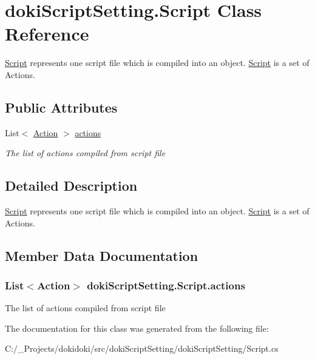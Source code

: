 \hypertarget{classdoki_script_setting_1_1_script}{}\section{doki\+Script\+Setting.\+Script Class Reference}
\label{classdoki_script_setting_1_1_script}


\hyperlink{classdoki_script_setting_1_1_script}{Script} represents one script file which is compiled into an object. \hyperlink{classdoki_script_setting_1_1_script}{Script} is a set of Actions.  


\subsection*{Public Attributes}
\begin{DoxyCompactItemize}
\item 
List$<$ \hyperlink{classdoki_script_setting_1_1_action}{Action} $>$ \hyperlink{classdoki_script_setting_1_1_script_a7c04074aaeee592285f12d92718bea52}{actions}
\begin{DoxyCompactList}\small\item\em The list of actions compiled from script file \end{DoxyCompactList}\end{DoxyCompactItemize}


\subsection{Detailed Description}
\hyperlink{classdoki_script_setting_1_1_script}{Script} represents one script file which is compiled into an object. \hyperlink{classdoki_script_setting_1_1_script}{Script} is a set of Actions. 



\subsection{Member Data Documentation}
\subsubsection[{\texorpdfstring{actions}{actions}}]{\setlength{\rightskip}{0pt plus 5cm}List$<${\bf Action}$>$ doki\+Script\+Setting.\+Script.\+actions}\hypertarget{classdoki_script_setting_1_1_script_a7c04074aaeee592285f12d92718bea52}{}\label{classdoki_script_setting_1_1_script_a7c04074aaeee592285f12d92718bea52}


The list of actions compiled from script file 



The documentation for this class was generated from the following file\+:\begin{DoxyCompactItemize}
\item 
C\+:/\+\_\+\+Projects/dokidoki/src/doki\+Script\+Setting/doki\+Script\+Setting/Script.\+cs\end{DoxyCompactItemize}
